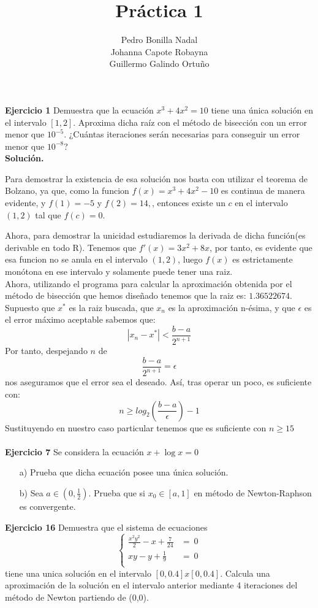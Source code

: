 \documentclass[11pt]{article}
\title{\textbf{Práctica 1}}
\author{Pedro Bonilla Nadal\\
		Johanna Capote Robayna\\
		Guillermo Galindo Ortuño}
\date{}
\begin{document}
\maketitle

\textbf{Ejercicio 1}
Demuestra que la ecuaci\'on $x^3 + 4x^2 = 10 $ tiene una \'unica soluci\'on en el intervalo $ [1,2] $. Aproxima dicha ra\'iz con el m\'etodo de bisecci\'on con un error menor que $10^{-5}$. ¿Cu\'antas iteraciones ser\'an necesarias para conseguir un error menor que $10^{-8}$?
\\

\textbf{Solución.}

Para demostrar la existencia de esa solución nos basta con utilizar el teorema de Bolzano, ya que, como la funcion $f(x)=x^3 +4x^2 -10$ es continua de manera evidente, y $f(1) = -5$ y $f(2) =  14,$, entonces existe un $c$ en el intervalo $(1,2)$ tal que $f(c) = 0$.

Ahora, para demostrar la unicidad estudiaremos la derivada de dicha función(es derivable en todo
 R). Tenemos que $f'(x) = 3x^2 +8x$, por tanto, es evidente que esa funcion no se anula en el intervalo $(1,2)$, luego $f(x)$ es estrictamente monótona en ese intervalo y solamente puede tener una raiz.
\\

Ahora, utilizando el programa para calcular la aproximación obtenida por el método de bisección que hemos diseñado tenemos que la raiz es: $1.36522674$.
\\

Supuesto que $x^*$ es la raiz buscada, que $x_n$ es la aproximación n-ésima, y que $\epsilon$ es el error máximo aceptable sabemos que:
$$|x_n - x^*| < \frac{b-a}{2^{n+1}}$$
Por tanto, despejando $n$ de
$$\frac{b-a}{2^{n+1}} = \epsilon$$
nos aseguramos que el error sea el deseado. Así, tras operar un poco, es suficiente con:
$$ n \geq log_2(\frac{b-a}{\epsilon})-1$$
Sustituyendo en nuestro caso particular tenemos que es suficiente con $n \geq 15$
\\ \\

\textbf{Ejercicio 7}
Se considera la ecuaci\'on $x + \log x = 0$
\begin{itemize}
\item[a)]Prueba que dicha ecuaci\'on posee una \'unica soluci\'on.
\item[b)] Sea $a \in (0, \frac{1}{2})$. Prueba que  si $x_0 \in [a,1]$ en m\'etodo de Newton-Raphson es convergente.

\end{itemize}
\textbf{Ejercicio 16}
Demuestra que el sistema de ecuaciones
$$\begin{cases}
\frac{x^2y^2}{2} - x + \frac{7}{24} &= \ 0 \\
xy - y + \frac{1}{9} &= \ 0\\
\end{cases}$$
tiene una unica soluci\'on en el intervalo $[0, 0.4]x[0, 0.4]$. Calcula una aproximaci\'on de la soluci\'on en el intervalo anterior mediante 4 iteraciones del m\'etodo de Newton partiendo de (0,0).
\\
\end{document}
